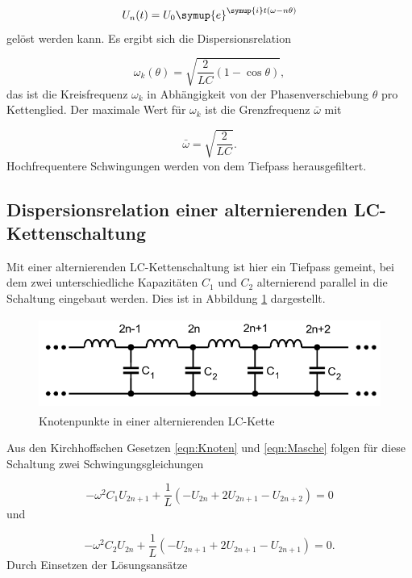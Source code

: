 \begin{equation}
  U_{n}(t) = U_0 \symup{e}^{\symup{i}t (\omega - n \theta)}
\end{equation}
gelöst werden kann.
Es ergibt sich die Dispersionsrelation

\begin{equation}
  \omega_k(\theta) = \sqrt{\frac{2}{LC}(1-\cos\theta)},
  \label{eqn:Dispersion}
\end{equation}
das ist die Kreisfrequenz
$\omega_k$ in Abhängigkeit von der Phasenverschiebung $\theta$ pro Kettenglied.
Der maximale Wert für $\omega_k$ ist die Grenzfrequenz $\bar{\omega}$
mit

\begin{equation}
  \bar{\omega} = \sqrt{\frac{2}{LC}}.
\end{equation}
Hochfrequentere Schwingungen werden von dem Tiefpass herausgefiltert.


\subsection{Dispersionsrelation einer alternierenden LC-Kettenschaltung}

Mit einer alternierenden LC-Kettenschaltung ist hier ein Tiefpass gemeint,
bei dem zwei unterschiedliche Kapazitäten $C_1$ und $C_2$ alternierend
parallel in die Schaltung eingebaut werden. Dies ist in Abbildung
\ref{fig:KetteLC1C2} dargestellt.

\newpage

\begin{figure}
  \centering
  \includegraphics[height=3cm]{KetteLC1C2.png}
  \caption{Knotenpunkte in einer alternierenden LC-Kette}
  \label{fig:KetteLC1C2}
\end{figure}
Aus den Kirchhoffschen Gesetzen \eqref{eqn:Knoten} und \eqref{eqn:Masche}
folgen für diese Schaltung zwei Schwingungsgleichungen

\begin{equation}
  -\omega^2 C_1 U_{2n+1} + \frac{1}{L}(-U_{2n}+2U_{2n+1}-U_{2n+2}) = 0
\end{equation}
und

\begin{equation}
  -\omega^2 C_2 U_{2n} + \frac{1}{L}(-U_{2n+1}+2U_{2n+1}-U_{2n+1}) = 0.
\end{equation}
Durch Einsetzen der Lösungsansätze


